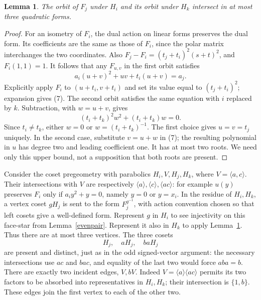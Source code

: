 \documentclass[11pt,a4paper]{article}
\newtheorem{lemma}{Lemma}\newtheorem{theorem}[lemma]{Theorem}
\newcommand{\gen}[1]{\langle #1\rangle}
\begin{document}
\begin{lemma}\label{evenconics}
The orbit of $F_j$ under $H_i$ and its orbit under $H_k$ intersect
in at most three quadratic forms.
\end{lemma}
\begin{proof}
For an isometry of $F_i$, the dual action on linear forms preserves
the dual form. Its coefficients are the same as those of $F_i$, since
the polar matrix interchanges the two coordinates. Also
$F_j-F_i=(t_j+t_i)^2(s+t)^2$, and $F_i(1,1)=1$.
It follows that any $F_{u,v}$ in the first orbit satisfies
\[
 a_i(u+v)^2+uv+t_i(u+v)=a_j.                              \tag{7}
\]
Explicitly apply $F_i$ to $(u+t_i,v+t_i)$ and set its value equal
to $(t_j+t_i)^2$; expansion gives (7). The second orbit satisfies
the same equation with $i$ replaced by $k$. Subtraction, with $w=u+v$,
gives
\[
 (t_i+t_k)^2w^2+(t_i+t_k)w=0.
\]
Since $t_i\ne t_k$, either $w=0$ or $w=(t_i+t_k)^{-1}$.
The first choice gives $u=v=t_j$ uniquely. In the second case, substitute
$v=u+w$ in (7); the resulting polynomial in $u$ has degree two and
leading coefficient one. It has at most two roots. We need only this
upper bound, not a supposition that both roots are present.
\end{proof}

Consider the coset pregeometry with parabolics $H_i,V,H_j,H_k$, where
$V=\gen{a,c}$. Their intersections with $V$ are respectively
$\gen a,\gen c,\gen{ac}$: for example $u(y)$ preserves $F_i$ only if
$a_i y^2+y=0$, namely $y=0$ or $y=x_i$.
In the residue of $H_i,H_k$, a vertex coset $gH_j$ is sent to
the form $F_j^{g^{-1}}$, with action convention chosen so that left
cosets give a well-defined form. Represent $g$ in $H_i$ to see injectivity
on this face-star from Lemma~\ref{evenpair}. Represent it also in $H_k$
to apply Lemma~\ref{evenconics}. Thus there are at most three vertices.
The three cosets
\[
                        H_j,\quad aH_j,\quad baH_j
\]
are present and distinct, just as in the odd signed-vector argument:
the necessary intersections use $ac$ and $bac$, and equality of the last
two would force $aba=b$. There are exactly two incident edges, $V,bV$.
Indeed $V=\gen a\gen{ac}$ permits its two factors to be absorbed into
representatives in $H_i,H_k$; their intersection is $\{1,b\}$.
These edges join the first vertex to each of the other two.
\end{document}
